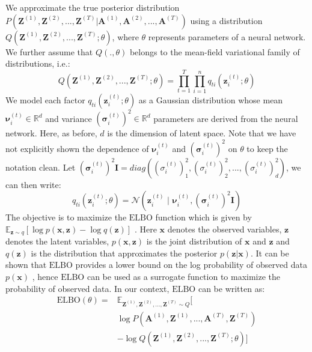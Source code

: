 \documentclass[letterpaper]{article} %
\begin{document}
We approximate the true posterior distribution $P(\mathbf{Z}^{(1)}, \mathbf{Z}^{(2)}, ..., \mathbf{Z}^{(T)} | \mathbf{A}^{(1)}, \mathbf{A}^{(2)}, ..., \mathbf{A}^{(T)})$ using a distribution $Q(\mathbf{Z}^{(1)}, \mathbf{Z}^{(2)}, ..., \mathbf{Z}^{(T)}; \theta)$, where $\theta$ represents parameters of a neural network. We further assume that $Q(., \theta)$ belongs to the mean-field variational family of distributions, i.e.:
\begin{equation}
    \label{eq:meanfield}
    Q(\mathbf{Z}^{(1)}, \mathbf{Z}^{(2)}, ..., \mathbf{Z}^{(T)}; \theta) = \prod_{t = 1}^{T} \prod_{i=1}^{{n}} q_{ti}(\mathbf{z}_i^{(t)}; \theta)
\end{equation}
We model each factor $q_{ti}(\mathbf{z}_i^{(t)}; \theta)$ as a Gaussian distribution whose mean $\bm{\nu}_i^{(t)} \in \mathbb{R}^d$ and variance ${(\bm{\sigma}_i^{(t)})^2} \in \mathbb{R}^d$ parameters are derived from the neural network. Here, as before, $d$ is the dimension of latent space. Note that we have not explicitly shown the dependence of $\bm{\nu}_i^{(t)}$ and ${(\bm{\sigma}_i^{(t)})^2}$ on $\theta$ to keep the notation clean. Let ${(\bm{\sigma}_i^{(t)})^2} \mathbf{I} = diag((\sigma_i^{(t)})_1^2, (\sigma_i^{(t)})_2^2, ..., (\sigma_i^{(t)})_d^2)$, we can then write:
\begin{equation}
    \label{eq:meanfieldfactordefinition}
    q_{ti}(\mathbf{z}_i^{(t)}; \theta) = \mathcal{N}(\mathbf{z}_i^{(t)} \,\,|\,\, \bm{\nu}_i^{(t)},  {(\bm{\sigma}_i^{(t)})^2} \mathbf{I})
\end{equation}
The objective is to maximize the $\mathrm{ELBO}$ function which is given by $\mathbb{E}_{\mathbf{z} \sim q}[\log p(\mathbf{x}, \mathbf{z}) - \log q(\mathbf{z})]$ \cite{BleiEtAl:2017:VariationalInferenceAReviewForStatisticians}. Here $\mathbf{x}$ denotes the observed variables, $\mathbf{z}$ denotes the latent variables, $p(\mathbf{x}, \mathbf{z})$ is the joint distribution of $\mathbf{x}$ and $\mathbf{z}$ and $q(\mathbf{z})$ is the distribution that approximates the posterior $p(\mathbf{z}|\mathbf{x})$. It can be shown that $\mathrm{ELBO}$ provides a lower bound on the log probability of observed data $p(\mathbf{x})$ \cite{KingmaEtAl:2013:AutoEncodingVariationalBayes}, hence $\mathrm{ELBO}$ can be used as a surrogate function to maximize the probability of observed data. In our context, $\mathrm{ELBO}$ can be written as:
\begin{equation}
    \label{eq:elbo}
    \begin{split}
        \mathrm{ELBO}(\theta) = &\mathbb{E}_{\mathbf{Z}^{(1)}, \mathbf{Z}^{(2)}, ..., \mathbf{Z}^{(T)} \sim Q}[ \\
        &\log P(\mathbf{A}^{(1)}, \mathbf{Z}^{(1)}, ..., \mathbf{A}^{(T)}, \mathbf{Z}^{(T)}) \\
        &- \log Q(\mathbf{Z}^{(1)}, \mathbf{Z}^{(2)}, ..., \mathbf{Z}^{(T)}; \theta)]
    \end{split}
\end{equation}
\end{document}
